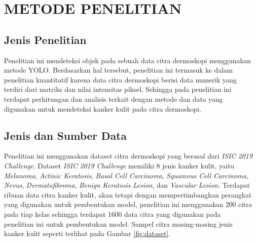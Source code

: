\chapter{METODE PENELITIAN}

\section{Jenis Penelitian}
Penelitian ini mendeteksi objek pada sebuah data citra dermoskopi menggunakan metode YOLO. Berdasarkan hal tersebut, penelitian ini termasuk ke dalam penelitian kuantitatif karena data citra dermoskopi berisi data numerik yang terdiri dari matriks dan nilai intensitas piksel. Sehingga pada penelitian ini terdapat perhitungan dan analisis terkait dengan metode dan data yang digunakan untuk mendeteksi kanker kulit pada citra dermoskopi.

\section{Jenis dan Sumber Data}
Penelitian ini menggunakan dataset citra dermoskopi yang berasal dari \textit{ISIC 2019 Challenge}. Dataset \textit{ISIC 2019 Challenge} memiliki 8 jenis kanker kulit, yaitu \textit{Melanoma}, \textit{Actinic Keratosis}, \textit{Basal Cell Carcinoma}, \textit{Squamous Cell Carcinoma}, \textit{Nevus}, \textit{Dermatofibroma}, \textit{Benign Keratosis Lesion}, dan \textit{Vascular Lesion}. Terdapat ribuan data citra kanker kulit, akan tetapi dengan mempertimbangkan perangkat yang digunakan untuk pembentukan model, penelitian ini menggunakan 200 citra pada tiap kelas sehingga terdapat 1600 data citra yang digunakan pada penelitian ini untuk pembentukan model. Sampel citra masing-masing jenis kanker kulit seperti terlihat pada Gambar \ref{fig:dataset}.

